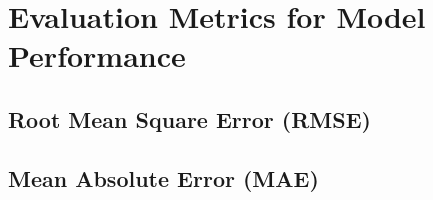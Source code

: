 \section{Evaluation Metrics for Model Performance}
\subsection{Root Mean Square Error (RMSE)} %
\subsection{Mean Absolute Error (MAE)} %


